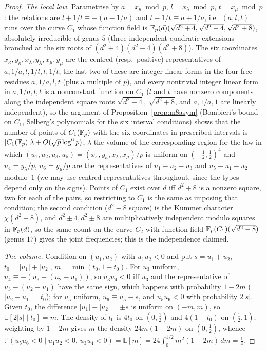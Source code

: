 \begin{proof}
\emph{The local law.}  Parametrise by $a=x_\kappa\bmod p$, $l=x_\lambda\bmod p$, $t=x_\mu\bmod p$: the relations are $l+1/l\equiv-(a-1/a)$
and $t-1/t\equiv a+1/a$, i.e.\ $(a,l,t)$ runs over the curve $C_1$ whose function field is $\mathbb{F}_p(d)(\sqrt{d^2+4},\sqrt{d^2-4},\sqrt{d^2+8})$,
absolutely irreducible of genus $5$ (three independent quadratic extensions branched at the six roots of $(d^2+4)(d^2-4)(d^2+8)$).
The six coordinates $x_\kappa,y_\kappa,x_\lambda,y_\lambda,x_\mu,y_\mu$ are the centred (resp.\ positive) representatives of
$a,1/a,l,1/l,t,1/t$; the last two of these are integer linear forms in the four free residues $a,1/a,l,t$ (plus a multiple of $p$), and every
nontrivial integer linear form in $a,1/a,l,t$ is a nonconstant function on $C_1$ ($l$ and $t$ have nonzero components along the
independent square roots $\sqrt{d^2-4}$, $\sqrt{d^2+8}$, and $a,1/a,1$ are linearly independent), so the argument of
Proposition~\ref{prop:m8asym} (Bombieri's bound on $C_1$, Selberg's polynomials for the six interval conditions) shows that the number of points of $C_1(\mathbb{F}_p)$ with the six coordinates
in prescribed intervals is $|C_1(\mathbb{F}_p)|\lambda+O(\sqrt p\log^6p)$, $\lambda$ the volume of the corresponding region for the law in which
$(u_1,u_2,u_3,u_5)=(x_\kappa,y_\kappa,x_\lambda,x_\mu)/p$ is uniform on $(-\tfrac12,\tfrac12)^4$ and $u_4=y_\lambda/p$, $u_6=y_\mu/p$ are the
representatives of $u_1-u_2-u_3$ and $u_5-u_1-u_2$ modulo~$1$ (we may use centred representatives throughout, since the types
depend only on the signs).  Points of $C_1$ exist over $d$ iff $d^2+8$ is a nonzero square, two for each of the pairs, so restricting to
$C_1$ is the same as imposing that condition; the second condition ($d^2-8$ square) is the Kummer character $\chi(d^2-8)$, and
$d^2\pm4,d^2\pm8$ are multiplicatively independent modulo squares in $\mathbb{F}_p(d)$, so the same count on the curve $C_2$ with function
field $\mathbb{F}_p(C_1)(\sqrt{d^2-8})$ (genus $17$) gives the joint frequencies; this is the independence claimed.

\emph{The volume.}  Condition on $(u_1,u_2)$ with $u_1u_2<0$ and put $s=u_1+u_2$, $t_0=|u_1|+|u_2|$, $m=\min(t_0,1-t_0)$.  For $u_3$
uniform, $u_4\equiv-(u_3-(u_2-u_1))$, so $u_3u_4<0$ iff $u_3$ and the representative of $u_3-(u_2-u_1)$ have the same sign, which
happens with probability $1-2m$ ($|u_2-u_1|=t_0$); for $u_5$ uniform, $u_6\equiv u_5-s$, and $u_5u_6<0$ with probability $2|s|$.  Given
$t_0$, the difference $|u_1|-|u_2|=\pm s$ is uniform on $(-m,m)$, so $\mathbb E[2|s|\mid t_0]=m$.  The density of $t_0$ is $4t_0$ on
$(0,\tfrac12)$ and $4(1-t_0)$ on $(\tfrac12,1)$; weighting by $1-2m$ gives $m$ the density $24m(1-2m)$ on $(0,\tfrac12)$, whence
$\mathbb P(u_5u_6<0\mid u_1u_2<0,\,u_3u_4<0)=\mathbb E[m]=24\int_0^{1/2}m^2(1-2m)\,dm=\tfrac14$.
\end{proof}

